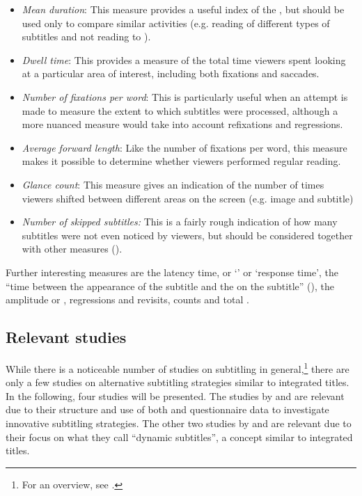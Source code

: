 \begin{itemize}
\item \textit{Mean  duration}: This measure provides a useful index of the , but should be used only to compare similar activities (e.g. reading of different types of subtitles and not reading to ).
\item \textit{Dwell time}: This provides a measure of the total time viewers spent looking at a particular area of interest, including both fixations and saccades.
\item \textit{Number of fixations per word}: This is particularly useful when an attempt is made to measure the extent to which subtitles were processed, although a more nuanced measure would take into account refixations and regressions.
\item \textit{Average forward  length}: Like the number of fixations per word, this measure makes it possible to determine whether viewers performed regular reading.
\item \textit{Glance count}: This measure gives an indication of the number of times viewers shifted between different areas on the screen (e.g. image and subtitle)
\item \textit{Number of skipped subtitles:} This is a fairly rough indication of how many subtitles were not even noticed by viewers, but should be considered together with other measures (\citealt{Kruger????}).
\end{itemize}

Further interesting measures are the latency time, or ‘’ or ‘response time’, the “time between the appearance of the subtitle and the  on the subtitle” (\citealt{Kruger????}), the  amplitude or , regressions and revisits,  counts and total .

\subsection{Relevant studies}\label{sec:6.3.2}

While there is a noticeable number of  studies on subtitling in general,\footnote{For an overview, see \citet{perego2012}.} there are only a few studies on alternative subtitling strategies similar to integrated titles. In the following, four studies will be presented. The studies by \citet{Kunzli2011} and \citet{Caffrey2009} are relevant due to their structure and use of both  and questionnaire data to investigate innovative subtitling strategies. The other two studies by \citet{Armstrong2014} and \citet{Brown2015} are relevant due to their focus on what they call “dynamic subtitles”, a concept similar to integrated titles.

